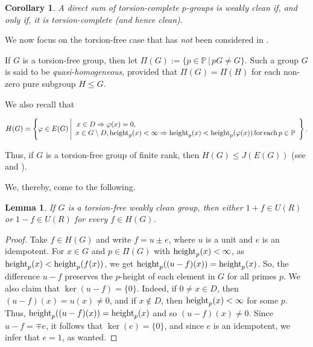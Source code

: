 \documentclass{amsart}
\newtheorem{lemma}[theorem]{Lemma}
\newtheorem{corollary}[theorem]{Corollary}
\theoremstyle{definition}
\theoremstyle{remark}
\numberwithin{equation}{section}
\begin{document}
\begin{corollary}
A direct sum of torsion-complete $p$-groups is weakly clean if, and only if, it is torsion-complete (and hence clean).
\end{corollary}

We now focus on the torsion-free case that has {\it not} been considered in \cite{GV}.

\medskip

If $G$ is a torsion-free group, then let $\Pi(G):=\{p\in\mathbb{P}\,|\,pG\neq G\}$. Such a group $G$ is said to be {\it quasi-homogeneous}, provided that $\Pi(G)=\Pi(H)$ for each non-zero pure subgroup $H\leq G$.

\medskip

We also recall that

\medskip

\[
H(G)=
\left\{\varphi\in E(G)\,
\Bigg|
\begin{array}{l}
\,x\in D \Rightarrow \varphi(x)=0,\\
 x\in G\setminus D, {\rm height}_p(x)<\infty \Rightarrow {\rm height}_p(x)<{\rm height}_p(\varphi(x))\, \mathrm{for\, each}\, p\in\mathbb{P}
\end{array}
\right\}.
\]

\medskip

Thus, if $G$ is a torsion-free group of finite rank, then $H(G)\leq J(E(G))$ (see \cite[Lemma 21.1]{KMT} and \cite{K}).

\medskip

We, thereby, come to the following.

\begin{lemma}
If $G$ is a torsion-free weakly clean group, then either $1+f\in U(R)$ or $1-f\in U(R)$ for every $f\in H(G)$.
\end{lemma}

\begin{proof} Take $f\in H(G)$ and write $f=u \pm e$, where $u$ is a unit and $e$ is an idempotent. For $x\in G$
and $p\in\Pi(G)$ with ${\rm height}_p(x)<\infty$, as ${\rm height}_p(x)<{\rm height}_p(f(x))$, we get ${\rm height}_p((u-f)(x))={\rm height}_p(x)$. So, the difference $u-f$ preserves the $p$-height of each element in
$G$ for all primes $p$. We also claim that $\ker(u-f)=\{0\}$. Indeed, if $0\neq x\in D$, then $(u-f)(x)=u(x)\neq 0$,
and if $x\not\in D$, then ${\rm height}_p(x)<\infty$ for some $p$. Thus, ${\rm height}_p((u-f)(x))={\rm height}_p(x)$ and so $(u-f)(x)\neq 0$. Since $u-f=\mp e$, it follows that $\ker(e)=\{0\}$, and since $e$ is an idempotent, we infer that $e=1$, as wanted.
\end{proof}
\end{document}
